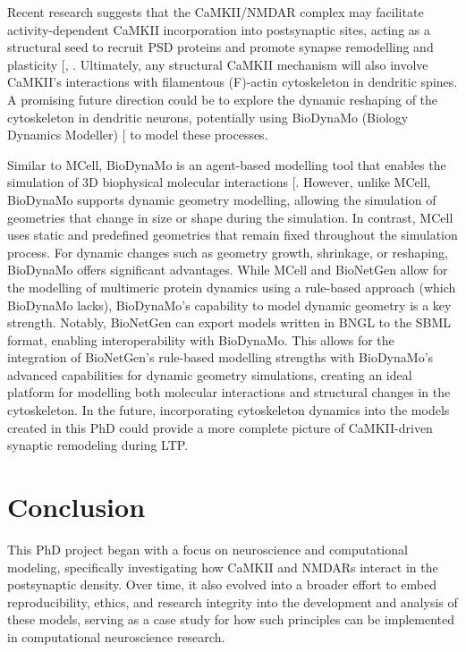 \documentclass[
  11pt,
  letterpaper,
]{scrreprt}
\begin{document}
Recent research suggests that the CaMKII/NMDAR complex may facilitate
activity-dependent CaMKII incorporation into postsynaptic sites, acting
as a structural seed to recruit PSD proteins and promote synapse
remodelling and plasticity {[},
\citeproc{ref-kim2016Interplay}{220}{]}. Ultimately, any structural
CaMKII mechanism will also involve CaMKII's interactions with
filamentous (F)-actin cytoskeleton in dendritic spines. A promising
future direction could be to explore the dynamic reshaping of the
cytoskeleton in dendritic neurons, potentially using BioDynaMo (Biology
Dynamics Modeller) {[}\citeproc{ref-breitwieser2021BioDynaMo}{478}{]} to
model these processes.

Similar to MCell, BioDynaMo is an agent-based modelling tool that
enables the simulation of 3D biophysical molecular interactions
{[}\citeproc{ref-breitwieser2021BioDynaMo}{478}{]}. However, unlike
MCell, BioDynaMo supports dynamic geometry modelling, allowing the
simulation of geometries that change in size or shape during the
simulation. In contrast, MCell uses static and predefined geometries
that remain fixed throughout the simulation process. For dynamic changes
such as geometry growth, shrinkage, or reshaping, BioDynaMo offers
significant advantages. While MCell and BioNetGen allow for the
modelling of multimeric protein dynamics using a rule-based approach
(which BioDynaMo lacks), BioDynaMo's capability to model dynamic
geometry is a key strength. Notably, BioNetGen can export models written
in BNGL to the SBML format, enabling interoperability with BioDynaMo.
This allows for the integration of BioNetGen's rule-based modelling
strengths with BioDynaMo's advanced capabilities for dynamic geometry
simulations, creating an ideal platform for modelling both molecular
interactions and structural changes in the cytoskeleton. In the future,
incorporating cytoskeleton dynamics into the models created in this PhD
could provide a more complete picture of CaMKII-driven synaptic
remodeling during LTP.

\section{Conclusion}\label{conclusion-1}

This PhD project began with a focus on neuroscience and computational
modeling, specifically investigating how CaMKII and NMDARs interact in
the postsynaptic density. Over time, it also evolved into a broader
effort to embed reproducibility, ethics, and research integrity into the
development and analysis of these models, serving as a case study for
how such principles can be implemented in computational neuroscience
research.
\end{document}
